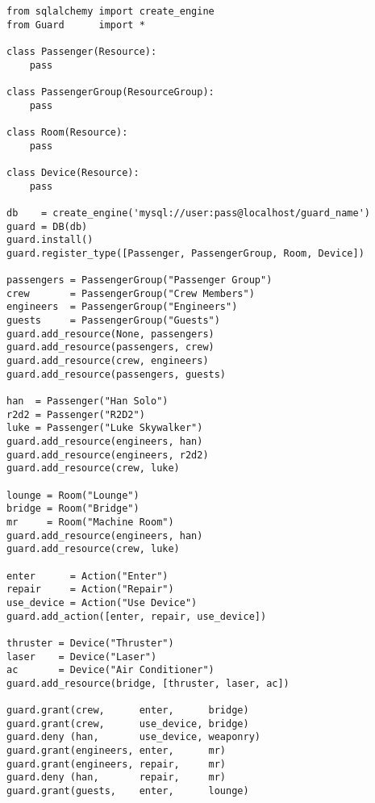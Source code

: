 \begin{lstlisting}
from sqlalchemy import create_engine
from Guard      import *

class Passenger(Resource):
    pass

class PassengerGroup(ResourceGroup):
    pass

class Room(Resource):
    pass

class Device(Resource):
    pass

db    = create_engine('mysql://user:pass@localhost/guard_name')
guard = DB(db)
guard.install()
guard.register_type([Passenger, PassengerGroup, Room, Device])

passengers = PassengerGroup("Passenger Group")
crew       = PassengerGroup("Crew Members")
engineers  = PassengerGroup("Engineers")
guests     = PassengerGroup("Guests")
guard.add_resource(None, passengers)
guard.add_resource(passengers, crew)
guard.add_resource(crew, engineers)
guard.add_resource(passengers, guests)

han  = Passenger("Han Solo")
r2d2 = Passenger("R2D2")
luke = Passenger("Luke Skywalker")
guard.add_resource(engineers, han)
guard.add_resource(engineers, r2d2)
guard.add_resource(crew, luke)

lounge = Room("Lounge")
bridge = Room("Bridge")
mr     = Room("Machine Room")
guard.add_resource(engineers, han)
guard.add_resource(crew, luke)

enter      = Action("Enter")
repair     = Action("Repair")
use_device = Action("Use Device")
guard.add_action([enter, repair, use_device])

thruster = Device("Thruster")
laser    = Device("Laser")
ac       = Device("Air Conditioner")
guard.add_resource(bridge, [thruster, laser, ac])

guard.grant(crew,      enter,      bridge)
guard.grant(crew,      use_device, bridge)
guard.deny (han,       use_device, weaponry)
guard.grant(engineers, enter,      mr)
guard.grant(engineers, repair,     mr)
guard.deny (han,       repair,     mr)
guard.grant(guests,    enter,      lounge)
\end{lstlisting}

